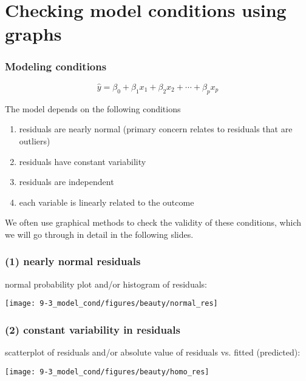 
\section{Checking model conditions using graphs}


\begin{frame}
\frametitle{Modeling conditions}

\[ \hat{y} = \beta_0 + \beta_1 x_1 + \beta_2 x_2 + \cdots + \beta_p x_p \] 

$\:$ \\

The model depends on the following conditions
\begin{enumerate}
\item residuals are nearly normal (primary concern relates to residuals that are outliers)
\item residuals have constant variability
\item residuals are independent
\item each variable is linearly related to the outcome \\
\end{enumerate}

We often use graphical methods to check the validity of these conditions, which we will go through in detail in the following slides.

\end{frame}


\begin{frame}
\frametitle{(1) nearly normal residuals}

normal probability plot and/or histogram of residuals: \\

\begin{center}
\texttt{[image: 9-3\_model\_cond/figures/beauty/normal\_res]}
\end{center}


\end{frame}


\begin{frame}
\frametitle{(2) constant variability in residuals}

scatterplot of residuals and/or absolute value of residuals vs. fitted (predicted): \\

\begin{center}
\texttt{[image: 9-3\_model\_cond/figures/beauty/homo\_res]}
\end{center}


\end{frame}

